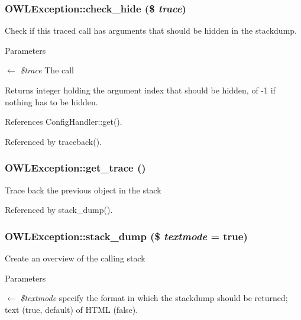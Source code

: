 \subsubsection[{check\_\-hide}]{\setlength{\rightskip}{0pt plus 5cm}OWLException::check\_\-hide (\$ {\em trace})}\label{classOWLException_ad5e675e393079574ff85ac862262baa0}
Check if this traced call has arguments that should be hidden in the stackdump. 
\begin{DoxyParams}{Parameters}
\item[\mbox{$\leftarrow$} {\em \$trace}]The call \end{DoxyParams}
\begin{DoxyReturn}{Returns}
integer holding the argument index that should be hidden, of -\/1 if nothing has to be hidden. 
\end{DoxyReturn}


References ConfigHandler::get().



Referenced by traceback().

\subsubsection[{get\_\-trace}]{\setlength{\rightskip}{0pt plus 5cm}OWLException::get\_\-trace ()}\label{classOWLException_abec096884c369f08040443561ac3b164}
Trace back the previous object in the stack 

Referenced by stack\_\-dump().

\subsubsection[{stack\_\-dump}]{\setlength{\rightskip}{0pt plus 5cm}OWLException::stack\_\-dump (\$ {\em textmode} = {\ttfamily true})}\label{classOWLException_acf2b94859fdebcefc22e8a75ac1a670d}
Create an overview of the calling stack


\begin{DoxyParams}{Parameters}
\item[\mbox{$\leftarrow$} {\em \$textmode}]specify the format in which the stackdump should be returned; text (true, default) of HTML (false). \end{DoxyParams}


